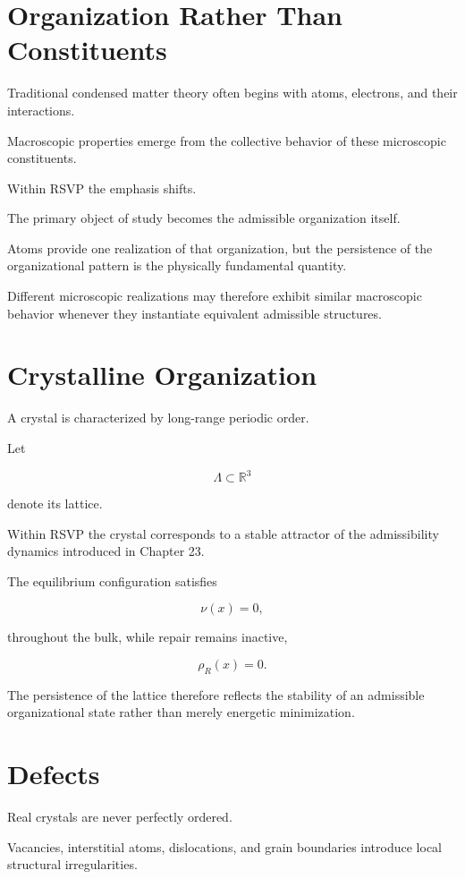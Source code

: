\documentclass[11pt,oneside]{book}
\numberwithin{equation}{chapter}
\theoremstyle{definition}
\theoremstyle{plain}
\begin{document}
\section{Organization Rather Than Constituents}

Traditional condensed matter theory often begins with atoms, electrons, and
their interactions.

Macroscopic properties emerge from the collective behavior of these
microscopic constituents.

Within RSVP the emphasis shifts.

The primary object of study becomes the admissible organization itself.

Atoms provide one realization of that organization, but the persistence of
the organizational pattern is the physically fundamental quantity.

Different microscopic realizations may therefore exhibit similar macroscopic
behavior whenever they instantiate equivalent admissible structures.

\section{Crystalline Organization}

A crystal is characterized by long-range periodic order.

Let

\[
\Lambda
\subset
\mathbb R^3
\]

denote its lattice.

Within RSVP the crystal corresponds to a stable attractor of the
admissibility dynamics introduced in Chapter 23.

The equilibrium configuration satisfies

\[
\nu(x)=0,
\]

throughout the bulk, while repair remains inactive,

\[
\rho_R(x)=0.
\]

The persistence of the lattice therefore reflects the stability of an
admissible organizational state rather than merely energetic minimization.

\section{Defects}

Real crystals are never perfectly ordered.

Vacancies, interstitial atoms, dislocations, and grain boundaries introduce
local structural irregularities.
\end{document}
